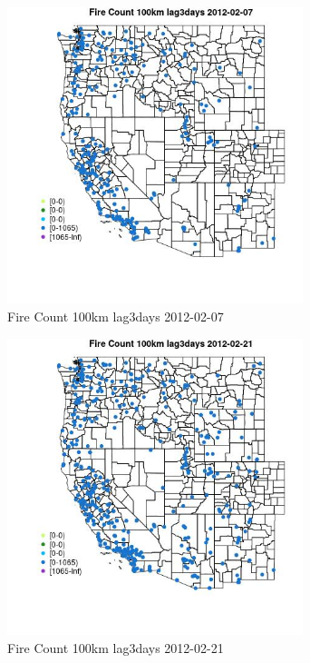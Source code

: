 \begin{figure} 
\centering  
\includegraphics[width=0.77\textwidth]{Code_Outputs/Report_ML_input_PM25_Step4_part_f_de_duplicated_aveswNAs_MapObsFire_Count_100km_lag3days2012-02-07.jpg} 
\caption{\label{fig:Report_ML_input_PM25_Step4_part_f_de_duplicated_aveswNAsMapObsFire_Count_100km_lag3days2012-02-07}Fire Count 100km lag3days 2012-02-07} 
\end{figure} 
 

\begin{figure} 
\centering  
\includegraphics[width=0.77\textwidth]{Code_Outputs/Report_ML_input_PM25_Step4_part_f_de_duplicated_aveswNAs_MapObsFire_Count_100km_lag3days2012-02-21.jpg} 
\caption{\label{fig:Report_ML_input_PM25_Step4_part_f_de_duplicated_aveswNAsMapObsFire_Count_100km_lag3days2012-02-21}Fire Count 100km lag3days 2012-02-21} 
\end{figure} 
 

